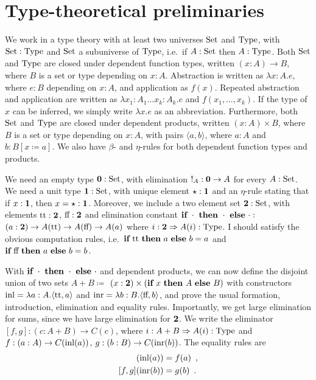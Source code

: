 \documentclass{article}
\begin{document}
\section{Type-theoretical preliminaries}
\label{sec:preliminaries}

We work in a type theory with at least two universes $\text{Set}$ and
$\text{Type}$, with $\text{Set} : \text{Type}$ and $\text{Set}$ a subuniverse of $\text{Type}$,
i.e.\ if $A : \text{Set}$ then $A : \text{Type}$. Both $\text{Set}$ and $\text{Type}$ are
closed under dependent function types, written $(x : A) \to B$, where
$B$ is a set or type depending on $x: A$. Abstraction is written as
$\lambda x : A . e$, where $e : B$ depending on $x : A$, and
application as $f(x)$. Repeated abstraction and application are
written as $\lambda x_1 : A_1 \ldots x_k : A_k . e$ and $f(x_1,
\ldots, x_k)$. If the type of $x$ can be inferred, we simply write
$\lambda x.e$ as an abbreviation.  Furthermore, both $\text{Set}$ and
$\text{Type}$ are closed under dependent products, written $(x : A) \times
B$, where $B$ is a set or type depending on $x: A$, with pairs
$\langle a , b \rangle$, where $a : A$ and $b : B[x \coloneqq a]$.
We also have $\beta$- and $\eta$-rules for both dependent function types
and products.

We need an empty type $\mathbf{0} : \text{Set}$, with elimination ${!_A : \mathbf{0}
  \to A}$ for every $A : \text{Set}$. We need a unit type $\mathbf{1} : \text{Set}$,
with unique element $\star : \mathbf{1}$ and an $\eta$-rule stating that
if $x : \mathbf{1}$, then $x = \star : \mathbf{1}$. Moreover, we include a two
element set $\mathbf{2} : \text{Set}$, with elements $\text{tt} : \mathbf{2}$, $\text{ff} :
\mathbf{2}$ and elimination constant $\textbf{if}~\cdot~\textbf{then}~\cdot~\textbf{else}~\cdot :$
$(a : \mathbf{2}) \to A(\text{tt}) \to A(\text{ff}) \to A(a)$ where $i : \mathbf{2}
\Rightarrow A(i) : \text{Type}$. I should satisfy the obvious computation
rules, i.e.\ $\textbf{if}~\text{tt}~\textbf{then}~a~\textbf{else}~b = a$ and
$\textbf{if}~\text{ff}~\textbf{then}~a~\textbf{else}~b = b$.

With $\textbf{if}~\cdot~\textbf{then}~\cdot~\textbf{else}~\cdot$ and dependent products, we can now
define the disjoint union of two sets $A + B \coloneqq$ ${(x : \mathbf{2})}
\times (\textbf{if}~x~\textbf{then}~A~\textbf{else}~B)$ with constructors $\text{inl} = \lambda {a :
  A} . \langle \text{tt} , a \rangle$ and $\text{inr} = \lambda {b : B}
. \langle \text{ff} , b \rangle$, and prove the usual formation,
introduction, elimination and equality rules. Importantly, we get
large elimination for sums, since we have large elimination for
$\mathbf{2}$. We write the eliminator $[f, g] : {(c : A + B)} \to C(c)$, where
$i : A + B \Rightarrow A(i) : \text{Type}$ and $f : (a : A) \to C(\text{inl}(a))$,
$g : (b : B) \to C(\text{inr}(b))$. The equality rules are
\begin{align*}
[f, g](\inl(a)) &= f(a) \enspace , \\
[f, g](\inr(b)) &= g(b) \enspace .
\end{align*}
\end{document}

